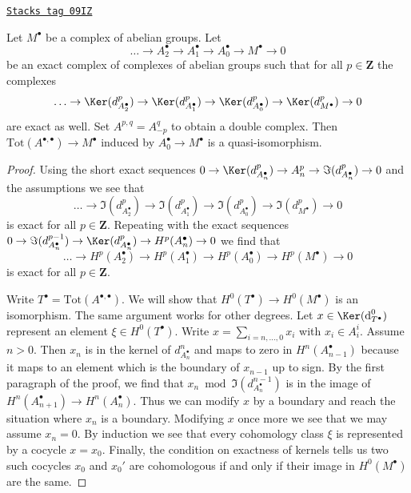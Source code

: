 \begin{lemma}
\label{homology-lemma-good-resolution-gives-qis}
\href{https://stacks.math.columbia.edu/tag/09IZ}{\texttt{Stacks tag 09IZ}}

Let $M^\bullet$ be a complex of abelian groups. Let
$$
\ldots \to A_2^\bullet \to A_1^\bullet \to A_0^\bullet \to M^\bullet \to 0
$$
be an exact complex of complexes of abelian groups such that for all
$p \in \mathbf{Z}$ the complexes
$$
\ldots \to \Ker(d_{A_2^\bullet}^p) \to \Ker(d_{A_1^\bullet}^p)
\to \Ker(d_{A_0^\bullet}^p) \to \Ker(d_{M^\bullet}^p) \to 0
$$
are exact as well. Set $A^{p, q} = A_{-p}^q$ to obtain a double
complex. Then $\text{Tot}(A^{\bullet, \bullet}) \to M^\bullet$
induced by $A_0^\bullet \to M^\bullet$ is a quasi-isomorphism.
\end{lemma}

\begin{proof}
Using the short exact sequences
$0 \to \Ker(d^p_{A_n^\bullet}) \to A_n^p \to \Im(d^p_{A_n^\bullet}) \to 0$
and the assumptions we see that
$$
\ldots \to \Im(d_{A_2^\bullet}^p) \to \Im(d_{A_1^\bullet}^p)
\to \Im(d_{A_0^\bullet}^p) \to \Im(d_{M^\bullet}^p) \to 0
$$
is exact for all $p \in \mathbf{Z}$. Repeating with the exact sequences
$0 \to \Im(d^{p - 1}_{A_n^\bullet}) \to \Ker(d^p_{A_n^\bullet})
\to H^p(A_n^\bullet) \to 0$ we find that
$$
\ldots \to H^p(A_2^\bullet) \to H^p(A_1^\bullet)
\to H^p(A_0^\bullet) \to H^p(M^\bullet) \to 0
$$
is exact for all $p \in \mathbf{Z}$.

\medskip\noindent
Write $T^\bullet = \text{Tot}(A^{\bullet, \bullet})$. We will show that
$H^0(T^\bullet) \to H^0(M^\bullet)$ is an isomorphism. The same argument
works for other degrees. Let $x \in \Ker(\text{d}_{T^\bullet}^0)$ represent
an element $\xi \in H^0(T^\bullet)$.
Write $x = \sum_{i = n, \ldots, 0} x_i$ with $x_i \in A_i^i$.
Assume $n > 0$. Then $x_n$ is in the kernel of $d_{A_n^\bullet}^n$
and maps to zero in $H^n(A_{n - 1}^\bullet)$ because it maps
to an element which is the boundary of $x_{n - 1}$ up to sign.
By the first paragraph of the proof, we find that
$x_n \bmod \Im(d^{n - 1}_{A_n^\bullet})$
is in the image of $H^n(A_{n + 1}^\bullet) \to H^n(A_n^\bullet)$.
Thus we can modify $x$ by a boundary and reach the situation
where $x_n$ is a boundary. Modifying $x$ once more we see that
we may assume $x_n = 0$. By induction we see that every cohomology
class $\xi$ is represented by a cocycle $x = x_0$.
Finally, the condition on exactness of kernels tells us
two such cocycles $x_0$ and $x_0'$ are cohomologous if
and only if their image in $H^0(M^\bullet)$ are the same.
\end{proof}

